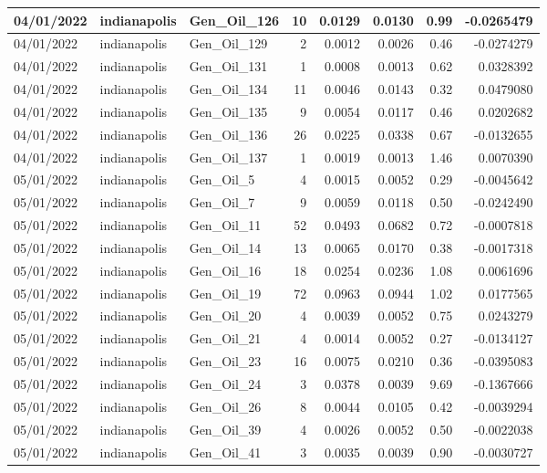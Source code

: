 \documentclass[
  letterpaper,
  DIV=11,
  numbers=noendperiod]{scrartcl}
\begin{document}
\begin{tabular}{l|l|l|r|r|r|r|r}
\hline
04/01/2022 & indianapolis & Gen\_Oil\_126 & 10 & 0.0129 & 0.0130 & 0.99 & -0.0265479\\
\hline
04/01/2022 & indianapolis & Gen\_Oil\_129 & 2 & 0.0012 & 0.0026 & 0.46 & -0.0274279\\
\hline
04/01/2022 & indianapolis & Gen\_Oil\_131 & 1 & 0.0008 & 0.0013 & 0.62 & 0.0328392\\
\hline
04/01/2022 & indianapolis & Gen\_Oil\_134 & 11 & 0.0046 & 0.0143 & 0.32 & 0.0479080\\
\hline
04/01/2022 & indianapolis & Gen\_Oil\_135 & 9 & 0.0054 & 0.0117 & 0.46 & 0.0202682\\
\hline
04/01/2022 & indianapolis & Gen\_Oil\_136 & 26 & 0.0225 & 0.0338 & 0.67 & -0.0132655\\
\hline
04/01/2022 & indianapolis & Gen\_Oil\_137 & 1 & 0.0019 & 0.0013 & 1.46 & 0.0070390\\
\hline
05/01/2022 & indianapolis & Gen\_Oil\_5 & 4 & 0.0015 & 0.0052 & 0.29 & -0.0045642\\
\hline
05/01/2022 & indianapolis & Gen\_Oil\_7 & 9 & 0.0059 & 0.0118 & 0.50 & -0.0242490\\
\hline
05/01/2022 & indianapolis & Gen\_Oil\_11 & 52 & 0.0493 & 0.0682 & 0.72 & -0.0007818\\
\hline
05/01/2022 & indianapolis & Gen\_Oil\_14 & 13 & 0.0065 & 0.0170 & 0.38 & -0.0017318\\
\hline
05/01/2022 & indianapolis & Gen\_Oil\_16 & 18 & 0.0254 & 0.0236 & 1.08 & 0.0061696\\
\hline
05/01/2022 & indianapolis & Gen\_Oil\_19 & 72 & 0.0963 & 0.0944 & 1.02 & 0.0177565\\
\hline
05/01/2022 & indianapolis & Gen\_Oil\_20 & 4 & 0.0039 & 0.0052 & 0.75 & 0.0243279\\
\hline
05/01/2022 & indianapolis & Gen\_Oil\_21 & 4 & 0.0014 & 0.0052 & 0.27 & -0.0134127\\
\hline
05/01/2022 & indianapolis & Gen\_Oil\_23 & 16 & 0.0075 & 0.0210 & 0.36 & -0.0395083\\
\hline
05/01/2022 & indianapolis & Gen\_Oil\_24 & 3 & 0.0378 & 0.0039 & 9.69 & -0.1367666\\
\hline
05/01/2022 & indianapolis & Gen\_Oil\_26 & 8 & 0.0044 & 0.0105 & 0.42 & -0.0039294\\
\hline
05/01/2022 & indianapolis & Gen\_Oil\_39 & 4 & 0.0026 & 0.0052 & 0.50 & -0.0022038\\
\hline
05/01/2022 & indianapolis & Gen\_Oil\_41 & 3 & 0.0035 & 0.0039 & 0.90 & -0.0030727\\

\end{tabular}
\end{document}
